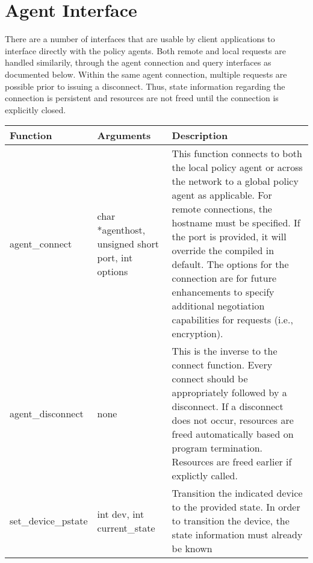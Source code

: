 \section{Agent Interface}

There are a number of interfaces that are usable by client applications
to interface directly with the policy agents.  Both remote and local
requests are handled similarily, through the agent connection and query
interfaces as documented below.  Within the same agent connection,
multiple requests are possible prior to issuing a disconnect.  Thus,
state information regarding the connection is persistent and resources
are not freed until the connection is explicitly closed.

\begin{table}[h]
\begin{tabular}{|l|p{4cm}|p{8cm}|}
\hline
Function & Arguments & Description \\
\hline
agent\_connect &
char *agenthost,
unsigned short port,
int options &
This function connects to both the local policy agent or across the
network to a global policy agent as applicable.  For remote connections,
the hostname must be specified.  If the port is provided, it will override
the compiled in default.  The options for the connection are for future
enhancements to specify additional negotiation capabilities for requests
(i.e., encryption). \\

\hline 
agent\_disconnect &
none &
This is the inverse to the connect function.  Every connect should be
appropriately followed by a disconnect.  If a disconnect does not occur,
resources are freed automatically based on program termination.  Resources
are freed earlier if explictly called. \\

\hline
set\_device\_pstate &
int dev,
int current\_state &
Transition the indicated device to the provided state. In order to transition
the device, the state information must already be known \\

\hline
\end{tabular}
\end{table}

